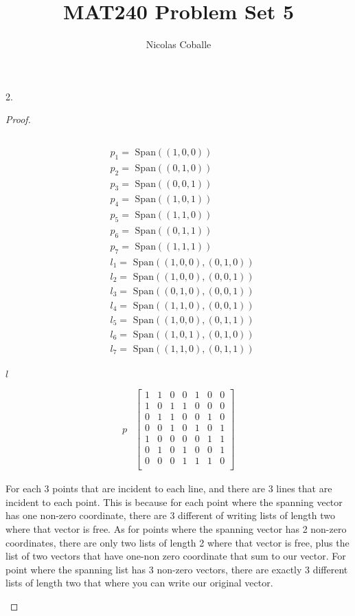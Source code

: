 \documentclass[11pt]{article}
\title{MAT240 Problem Set 5}
\author{Nicolas Coballe}
\newenvironment{myproof}
{\begin{proof} \begin{adjustwidth}{3em}{0pt}$ $\par\nobreak\ignorespaces}
{\end{adjustwidth} \end{proof}}
\begin{document}
\maketitle
\begin{flushleft}

2.

\begin{myproof}
\begin{align*}
&p_1 = \text{ Span}((1,0,0)) \\ 
&p_2 = \text{ Span}((0,1,0)) \\
&p_3 = \text{ Span}((0,0,1)) \\
&p_4 = \text{ Span}((1,0,1)) \\
&p_5 = \text{ Span}((1,1,0)) \\
&p_6 = \text{ Span}((0,1,1)) \\
&p_7 = \text{ Span}((1,1,1)) \\
&l_1 = \text{ Span}((1,0,0),(0,1,0)) \\
&l_2 = \text{ Span}((1,0,0),(0,0,1)) \\
&l_3 = \text{ Span}((0,1,0),(0,0,1)) \\
&l_4 = \text{ Span}((1,1,0),(0,0,1)) \\
&l_5 = \text{ Span}((1,0,0),(0,1,1)) \\
&l_6 = \text{ Span}((1,0,1),(0,1,0)) \\
&l_7 = \text{ Span}((1,1,0),(0,1,1)) \\
\end{align*}
\begin{center}
\newpage
$l$
\end{center}
\begin{align*}
p
&\begin{bmatrix}
1 & 1 &0 &0 &1 &0 &0\\
1 & 0 &1 &1 &0 &0 &0\\  
0 & 1 &1 &0 &0 &1 &0\\
0 & 0 &1 &0 &1 &0 &1\\
1 & 0 &0 &0 &0 &1 &1\\
0 & 1 &0 &1 &0 &0 &1\\
0 & 0 &0 &1 &1 &1 &0\\
\end{bmatrix}
\end{align*}

For each 3 points that are incident to each line, and there are 3 lines that are incident to each point. This is because for each point where the spanning vector has one non-zero coordinate, there are 3 different of writing lists of length two where that vector is free. As for points where the spanning vector has 2 non-zero coordinates, there are only two lists of length 2 where that vector is free, plus the list of two vectors that have one-non zero coordinate that sum to our vector. For point where the spanning list has 3 non-zero vectors, there are exactly 3 different lists of length two that where you can write our original vector.
\end{myproof}


\end{flushleft}
\end{document}
